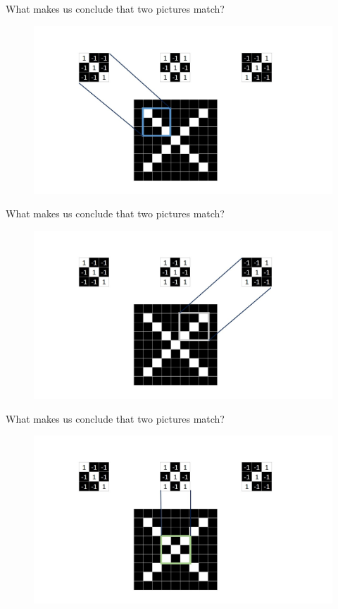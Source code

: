 \documentclass[12pt]{beamer}
\begin{document}
\begin{frame}{What makes us conclude that two pictures match?}
\begin{figure}
\includegraphics[width = 0.8\linewidth]{images/feat1.jpg}
\label{fig:principle}
\end{figure}
\end{frame}

\begin{frame}{What makes us conclude that two pictures match?}
\begin{figure}
\includegraphics[width = 0.8\linewidth]{images/feat2.jpg}
\label{fig:principle}
\end{figure}
\end{frame}

\begin{frame}{What makes us conclude that two pictures match?}
\begin{figure}
\includegraphics[width = 0.8\linewidth]{images/feat3.jpg}
\label{fig:principle}
\end{figure}
\end{frame}
\end{document}

